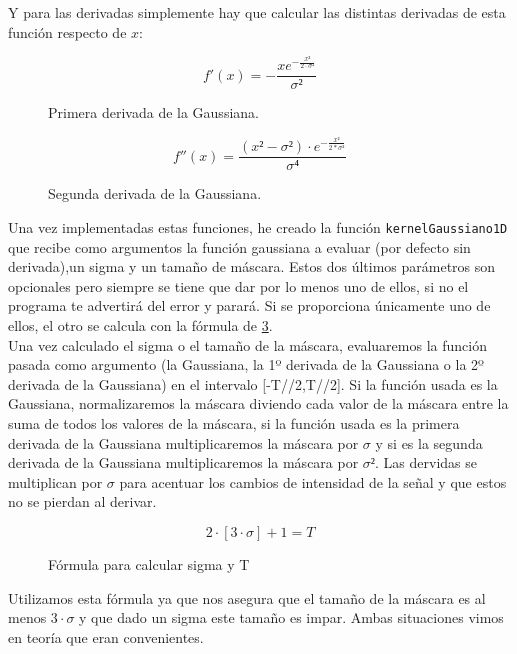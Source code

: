\documentclass[12pt,spanish]{article}
\begin{document}
Y para las derivadas simplemente hay que calcular las distintas derivadas de esta función respecto de $x$: 

\begin{figure}[H]
	\centering
	\[f'(x) = -\frac{x e^{-\frac{x²}{2 \cdot \sigma²}}}{\sigma²} \]
	\caption{Primera derivada de la Gaussiana.}
	\label{1d_gaussiana}
\end{figure}

\begin{figure}[H]
	\centering
	\[f''(x) = \frac{(x² - \sigma²) \cdot e^{-\frac{x²}{2*\sigma²}}}{\sigma⁴} \]
	\caption{Segunda derivada de la Gaussiana.}
	\label{2d_gaussiana}
\end{figure}

Una vez implementadas estas funciones, he creado la función \texttt{kernelGaussiano1D} que recibe como argumentos la función gaussiana a evaluar (por defecto sin derivada),un sigma y un tamaño de máscara. Estos dos últimos parámetros son opcionales pero siempre se tiene que dar por lo menos uno de ellos, si no el programa te advertirá del error y parará. Si se proporciona únicamente uno de ellos, el otro se calcula con la fórmula de \ref{f_sigma_tam}. \\

Una vez calculado el sigma o el tamaño de la máscara, evaluaremos la función pasada como argumento (la Gaussiana, la 1º derivada de la Gaussiana o la 2º derivada de la Gaussiana) en el intervalo [-T//2,T//2]. Si la función usada es la Gaussiana, normalizaremos la máscara diviendo cada valor de la máscara entre la suma de todos los valores de la máscara, si la función usada es la primera derivada de la Gaussiana multiplicaremos la máscara por $\sigma$ y si es la segunda derivada de la Gaussiana multiplicaremos la máscara por $\sigma²$. Las dervidas se multiplican por $\sigma$ para acentuar los cambios de intensidad de la señal y que estos no se pierdan al derivar. 

\begin{figure}[H]
	\centering
	\[ 2 \cdot [3 \cdot \sigma] + 1 = T \]
	\caption{Fórmula para calcular sigma y T}
	\label{f_sigma_tam}
\end{figure}

\pagebreak

Utilizamos esta fórmula ya que nos asegura que el tamaño de la máscara es al menos $3 \cdot \sigma$ y que dado un sigma este tamaño es impar. Ambas situaciones vimos en teoría que eran convenientes. \\
\end{document}
